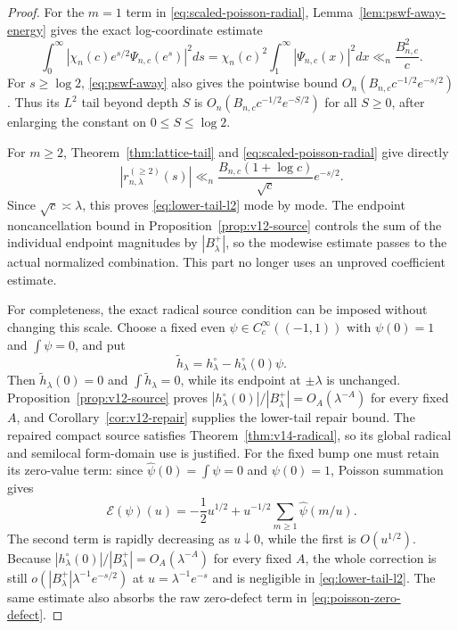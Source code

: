 \documentclass[11pt]{article}
\theoremstyle{remark}
\begin{document}
\begin{proof}
For the $m=1$ term in \eqref{eq:scaled-poisson-radial}, Lemma~\ref{lem:pswf-away-energy} gives the exact log-coordinate estimate
\[
 \int_0^\infty
 \left|\chi_n(c)e^{s/2}\Psi_{n,c}(e^s)\right|^2ds
 =\chi_n(c)^2\int_1^\infty|\Psi_{n,c}(x)|^2dx
 \ll_n\frac{B_{n,c}^2}{c}.
\]
For $s\ge\log2$, \eqref{eq:pswf-away} also gives the pointwise bound
$O_n(B_{n,c}c^{-1/2}e^{-s/2})$.  Thus its $L^2$ tail beyond depth $S$ is
$O_n(B_{n,c}c^{-1/2}e^{-S/2})$ for all $S\ge0$, after enlarging the constant on $0\le S\le\log2$.

For $m\ge2$, Theorem~\ref{thm:lattice-tail} and \eqref{eq:scaled-poisson-radial} give directly
\[
 |r_{n,\lambda}^{(\ge2)}(s)|
 \ll_n \frac{B_{n,c}(1+\log c)}{\sqrt c}e^{-s/2}.
\]
Since $\sqrt c\asymp\lambda$, this proves \eqref{eq:lower-tail-l2} mode by mode. The endpoint noncancellation bound in Proposition~\ref{prop:v12-source} controls the sum of the individual endpoint magnitudes by $|B_\lambda^+|$, so the modewise estimate passes to the actual normalized combination. This part no longer uses an unproved coefficient estimate.

For completeness, the exact radical source condition can be imposed without changing this scale.  Choose a fixed even $\psi\in C_c^\infty((-1,1))$ with $\psi(0)=1$ and $\int\psi=0$, and put
\[
 \widetilde h_\lambda=h_\lambda^{\circ}-h_\lambda^{\circ}(0)\psi.
\]
Then $\widetilde h_\lambda(0)=0$ and $\int\widetilde h_\lambda=0$, while its endpoint at $\pm\lambda$ is unchanged. Proposition~\ref{prop:v12-source} proves
$|h_\lambda^\circ(0)|/|B_\lambda^+|=O_A(\lambda^{-A})$ for every fixed $A$,
and Corollary~\ref{cor:v12-repair} supplies the lower-tail repair bound.
The repaired compact source satisfies Theorem~\ref{thm:v14-radical},
so its global radical and semilocal form-domain use is justified.
For the fixed bump one must retain its zero-value term: since $\widehat\psi(0)=\int\psi=0$ and $\psi(0)=1$, Poisson summation gives
\[
 \mathcal E(\psi)(u)
 =-\frac12u^{1/2}
   +u^{-1/2}\sum_{m\ge1}\widehat\psi(m/u).
\]
The second term is rapidly decreasing as $u\downarrow0$, while the first is $O(u^{1/2})$.  Because $|h_\lambda^{\circ}(0)|/|B_\lambda^{+}|=O_A(\lambda^{-A})$ for every fixed $A$, the whole correction is still $o(|B_\lambda^{+}|\lambda^{-1}e^{-s/2})$ at $u=\lambda^{-1}e^{-s}$ and is negligible in \eqref{eq:lower-tail-l2}.  The same estimate also absorbs the raw zero-defect term in \eqref{eq:poisson-zero-defect}.


\end{proof}
\end{document}
